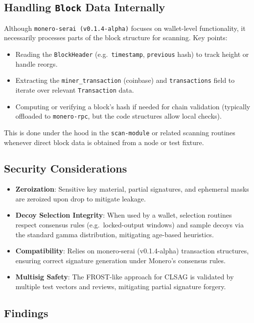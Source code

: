 \documentclass[12pt,a4paper]{article}
\begin{document}
\subsection*{Handling \texttt{Block} Data Internally}
Although \texttt{monero-serai (v0.1.4-alpha)} focuses on wallet-level functionality, it necessarily processes parts of the block structure for scanning. Key points:
\begin{itemize}
\item Reading the \texttt{BlockHeader} (e.g.\ \texttt{timestamp}, \texttt{previous} hash) to track height or handle reorgs.
\item Extracting the \texttt{miner\_transaction} (coinbase) and \texttt{transactions} field to iterate over relevant \texttt{Transaction} data.
\item Computing or verifying a block’s hash if needed for chain validation (typically offloaded to \texttt{monero-rpc}, but the code structures allow local checks).
\end{itemize}
This is done under the hood in the \texttt{scan-module} or related scanning routines whenever direct block data is obtained from a node or test fixture.

\subsection*{Security Considerations}

\begin{itemize}
\item \textbf{Zeroization}: Sensitive key material, partial signatures, and
  ephemeral masks are zeroized upon drop to mitigate leakage.
\item \textbf{Decoy Selection Integrity}: When used by a wallet,
      selection routines respect consensus rules (e.g.\ locked-output
      windows) and sample decoys via the standard gamma distribution,
      mitigating age-based heuristics.
\item \textbf{Compatibility}: Relies on \gls{monero-serai (v0.1.4-alpha)}
  transaction structures, ensuring correct signature generation under Monero’s
  consensus rules.
\item \textbf{Multisig Safety}: The FROST-like approach for CLSAG is validated
  by multiple test vectors and reviews, mitigating partial signature forgery.
\end{itemize}

\subsection{Findings}
\end{document}
